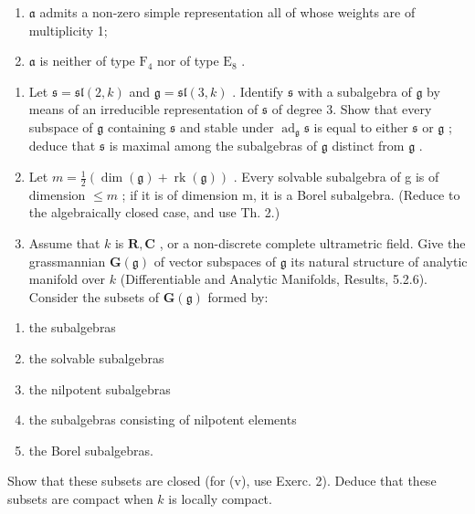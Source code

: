 \begin{enumerate}
\def\labelenumi{(\roman{enumi})}
\item
  \(\mathfrak{a}\) admits a non-zero simple representation all of whose weights are of multiplicity 1;
\item
  \(\mathfrak{a}\) is neither of type \(\mathrm{F}_4\) nor of type \(\mathrm{E}_8\) .
\end{enumerate}


\begin{enumerate}
\def\labelenumi{\arabic{enumi})}
\item
  Let \(\mathfrak{s} = \mathfrak{sl}(2, k)\) and \(\mathfrak{g} = \mathfrak{sl}(3, k)\) . Identify \(\mathfrak{s}\) with a subalgebra of \(\mathfrak{g}\) by means of an irreducible representation of \(\mathfrak{s}\) of degree 3. Show that every subspace of \(\mathfrak{g}\) containing \(\mathfrak{s}\) and stable under \(\operatorname{ad}_{\mathfrak{g}}\mathfrak{s}\) is equal to either \(\mathfrak{s}\) or \(\mathfrak{g}\) ; deduce that \(\mathfrak{s}\) is maximal among the subalgebras of \(\mathfrak{g}\) distinct from \(\mathfrak{g}\) .
\item
  Let \(m = \frac{1}{2}(\dim(\mathfrak{g}) + \operatorname{rk}(\mathfrak{g}))\) . Every solvable subalgebra of g is of dimension \(\leq m\) ; if it is of dimension m, it is a Borel subalgebra. (Reduce to the algebraically closed case, and use Th. 2.)
\item
  Assume that \(k\) is \(\mathbf{R}, \mathbf{C}\) , or a non-discrete complete ultrametric field. Give the grassmannian \(\mathbf{G}(\mathfrak{g})\) of vector subspaces of \(\mathfrak{g}\) its natural structure of analytic manifold over \(k\) (Differentiable and Analytic Manifolds, Results, 5.2.6). Consider the subsets of \(\mathbf{G}(\mathfrak{g})\) formed by:
\end{enumerate}

\begin{enumerate}
\def\labelenumi{(\roman{enumi})}
\item
  the subalgebras
\item
  the solvable subalgebras
\item
  the nilpotent subalgebras
\item
  the subalgebras consisting of nilpotent elements
\item
  the Borel subalgebras.
\end{enumerate}

Show that these subsets are closed (for (v), use Exerc. 2). Deduce that these subsets are compact when \(k\) is locally compact.


